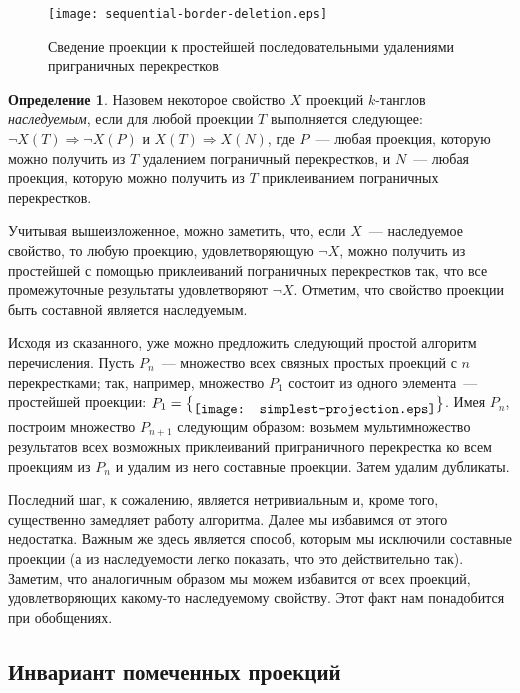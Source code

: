 \documentclass[12pt]{article}
\theoremstyle{plain}
\theoremstyle{definition}
\newtheorem{definition}{Определение}
\begin{document}
		\begin{figure}[ht]
			\centering
			\texttt{[image: sequential-border-deletion.eps]}
			\caption{\footnotesize Сведение проекции к простейшей последовательными удалениями приграничных перекрестков\label{figure:geneology}}
		\end{figure}

		\begin{definition}
			Назовем некоторое свойство $X$ проекций $k$-танглов \textit{наследуемым}, если для любой проекции $T$ выполняется следующее:
			$\neg X(T) \Rightarrow \neg X(P)$ и $X(T) \Rightarrow X(N)$, где $P$~--- любая проекция, которую можно получить из $T$
			удалением пограничный перекрестков, и $N$~--- любая проекция, которую можно получить из $T$ приклеиванием пограничных
			перекрестков.
		\end{definition}

		Учитывая вышеизложенное, можно заметить, что, если $X$~--- наследуемое свойство, то любую проекцию, удовлетворяющую $\neg X$, можно
		получить из простейшей с помощью приклеиваний пограничных перекрестков так, что все промежуточные результаты удовлетворяют $\neg X$.
		Отметим, что свойство проекции быть составной является наследуемым.

		Исходя из сказанного, уже можно предложить следующий простой алгоритм перечисления. Пусть $P_n$~---
		множество всех связных простых проекций с $n$ перекрестками; так, например, множество $P_1$
		состоит из одного элемента~---  простейшей проекции:
		$P_1=\bigl\{\raise-0.4em\hbox{\texttt{[image: simplest-projection.eps]}}\bigr\}$. Имея $P_n$, построим
		множество $P_{n+1}$ следующим образом: возьмем мультимножество результатов всех возможных
		приклеиваний приграничного перекрестка ко всем проекциям из $P_n$ и удалим из него составные проекции. Затем удалим дубликаты.

		Последний шаг, к сожалению, является нетривиальным и, кроме того, существенно замедляет работу алгоритма. Далее мы избавимся
		от этого недостатка. Важным же здесь является способ, которым мы исключили составные проекции (а из наследуемости легко показать,
		что это действительно так). Заметим, что аналогичным образом мы можем избавится от всех проекций, удовлетворяющих какому-то
		наследуемому свойству. Этот факт нам понадобится при обобщениях.

	\subsection{Инвариант помеченных проекций}
	\label{subsection:root-code}
\end{document}
